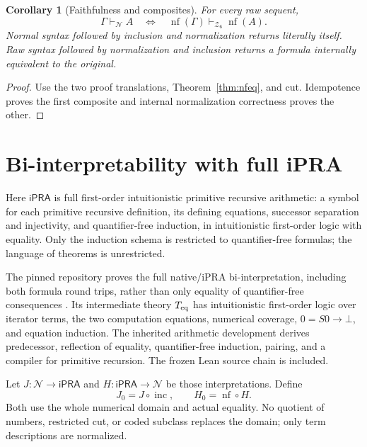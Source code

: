 \documentclass[11pt]{article}
\newtheorem{corollary}[theorem]{Corollary}
\newcommand{\IPRA}{\mathsf{iPRA}}
\newcommand{\N}{\mathcal N}
\newcommand{\Zsix}{\mathcal Z_6}
\newcommand{\nf}{\operatorname{nf}}\newcommand{\It}{\widehat I}
\begin{document}
\begin{corollary}[Faithfulness and composites]\label{cor:faithful}
For every raw sequent,
\[
 \Gamma\vdash_\N A
 \quad\Longleftrightarrow\quad
 \nf(\Gamma)\vdash_{\Zsix}\nf(A).
\]
Normal syntax followed by inclusion and normalization returns
literally itself. Raw syntax followed by normalization and inclusion
returns a formula internally equivalent to the original.
\end{corollary}
\begin{proof}
Use the two proof translations, Theorem~\ref{thm:nfeq}, and cut.
Idempotence proves the first composite and internal normalization
correctness proves the other.
\end{proof}

\section{Bi-interpretability with full iPRA}\label{sec:ipra}
Here \(\IPRA\) is full first-order intuitionistic primitive recursive
arithmetic: a symbol for each primitive recursive definition, its
defining equations, successor separation and injectivity, and
quantifier-free induction, in intuitionistic first-order logic with
equality. Only the induction schema is restricted to quantifier-free
formulas; the language of theorems is unrestricted.

The pinned repository proves the full native/iPRA bi-interpretation,
including both formula round trips, rather than only equality of
quantifier-free consequences \cite{nativebridge}.
Its intermediate theory \(T_{\rm eq}\) has intuitionistic first-order
logic over iterator terms, the two computation equations, numerical
coverage, \(0=S0\to\bot\), and equation induction. The inherited
arithmetic development derives predecessor, reflection of equality,
quantifier-free induction, pairing, and a compiler for primitive
recursion. The frozen Lean source chain is included.

Let \(J:\N\to\IPRA\) and \(H:\IPRA\to\N\) be those interpretations.
Define
\[
       J_0=J\circ\operatorname{inc},\qquad H_0=\nf\circ H .
\]
Both use the whole numerical domain and actual equality. No quotient
of numbers, restricted cut, or coded subclass replaces the domain;
only term descriptions are normalized.
\end{document}
